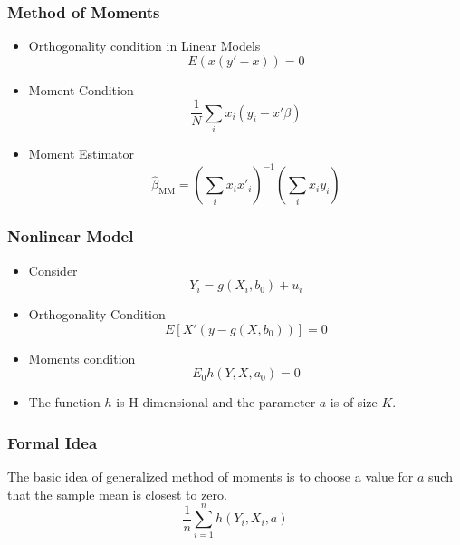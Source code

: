 \documentclass{beamer}
\newcommand{\1}{\mathbb{1}}
\begin{document}
\begin{frame}
\tableofcontents[currentsection] 
\end{frame}

\begin{frame}\frametitle{Method of Moments}
\begin{itemize}
\item Orthogonality condition in Linear Models
\begin{equation}
E(x(y'-x)) = 0
\end{equation}
\item Moment Condition
\begin{equation}
\dfrac{1}{N} \sum_i x_i(y_i - x'\beta)
\end{equation}
\item Moment Estimator
\begin{equation}
\hat{\beta}_{\text{MM}} = (\sum_i x_i x'_i)^{-1}(\sum_i x_i y_i)
\end{equation}
\end{itemize}
\end{frame}

\begin{frame}\frametitle{Nonlinear Model}
\begin{itemize}
\item Consider 
\begin{equation*}
Y_i = g(X_i,b_0) + u_i 
\end{equation*}
\item Orthogonality Condition
\begin{equation*}
E[X'(y-g(X,b_0))] = 0 
\end{equation*}
\item Moments condition
\begin{equation*}
E_0 h(Y,X,a_0) = 0
\end{equation*}
\item The function $h$ is H-dimensional and the parameter $a$ is of size $K$.
\end{itemize}
\end{frame}

\begin{frame}\frametitle{Formal Idea}
\begin{definition}
The basic idea of generalized method of moments is to choose a value for $a$ such that the sample mean is closest to zero.
\begin{equation*}
\dfrac{1}{n} \sum_{i=1}^{n} h(Y_i,X_i,a)
\end{equation*}
\end{definition}
\end{frame}
\end{document}
